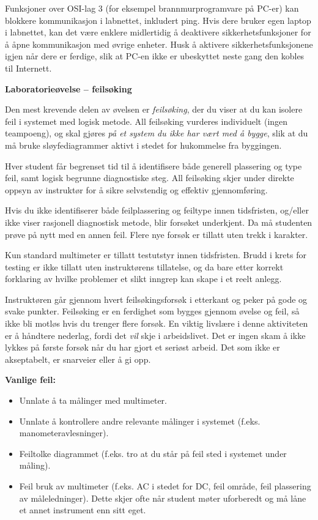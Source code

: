 \vskip 10pt

Funksjoner over OSI-lag 3 (for eksempel brannmurprogramvare på PC-er) kan blokkere kommunikasjon i labnettet, inkludert ping. Hvis dere bruker egen laptop i labnettet, kan det være enklere midlertidig å deaktivere sikkerhetsfunksjoner for å åpne kommunikasjon med øvrige enheter. Husk å aktivere sikkerhetsfunksjonene igjen når dere er ferdige, slik at PC-en ikke er ubeskyttet neste gang den kobles til Internett.



\vfil \eject

\noindent
{\bf Laboratorieøvelse -- feilsøking}

\vskip 5pt

Den mest krevende delen av øvelsen er {\it feilsøking}, der du viser at du kan isolere feil i systemet med logisk metode. All feilsøking vurderes individuelt (ingen teampoeng), og skal gjøres {\it på et system du ikke har vært med å bygge}, slik at du må bruke sløyfediagrammer aktivt i stedet for hukommelse fra byggingen.

Hver student får begrenset tid til å identifisere både generell plassering og type feil, samt logisk begrunne diagnostiske steg. All feilsøking skjer under direkte oppsyn av instruktør for å sikre selvstendig og effektiv gjennomføring.

Hvis du ikke identifiserer både feilplassering og feiltype innen tidsfristen, og/eller ikke viser rasjonell diagnostisk metode, blir forsøket underkjent. Da må studenten prøve på nytt med en annen feil. Flere nye forsøk er tillatt uten trekk i karakter.

Kun standard multimeter er tillatt testutstyr innen tidsfristen. Brudd i krets for testing er ikke tillatt uten instruktørens tillatelse, og da bare etter korrekt forklaring av hvilke problemer et slikt inngrep kan skape i et reelt anlegg.

Instruktøren går gjennom hvert feilsøkingsforsøk i etterkant og peker på gode og svake punkter. Feilsøking er en ferdighet som bygges gjennom øvelse og feil, så ikke bli motløs hvis du trenger flere forsøk. En viktig livslære i denne aktiviteten er å håndtere nederlag, fordi det {\it vil} skje i arbeidslivet. Det er ingen skam å ikke lykkes på første forsøk når du har gjort et seriøst arbeid. Det som ikke er akseptabelt, er snarveier eller å gi opp.

\vskip 10pt

{\bf Vanlige feil:}

\begin{itemize}
\item{} Unnlate å ta målinger med multimeter.
\item{} Unnlate å kontrollere andre relevante målinger i systemet (f.eks. manometeravlesninger).
\item{} Feiltolke diagrammet (f.eks. tro at du står på feil sted i systemet under måling).
\item{} Feil bruk av multimeter (f.eks. AC i stedet for DC, feil område, feil plassering av måleledninger). Dette skjer ofte når student møter uforberedt og må låne et annet instrument enn sitt eget.
\end{itemize}

